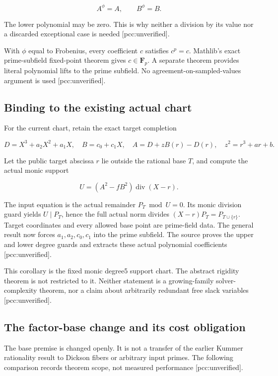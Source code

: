 \documentclass[
  10pt,
]{article}
\begin{document}
\[A^\phi=A,\qquad B^\phi=B.\]

The lower polynomial may be zero. This is why neither a division by its
value nor a discarded exceptional case is needed {[}pcc:unverified{]}.

With \(\phi\) equal to Frobenius, every coefficient \(c\) satisfies
\(c^p=c\). Mathlib's exact prime-subfield fixed-point theorem gives
\(c\in\mathbf F_p\). A separate theorem provides literal polynomial
lifts to the prime subfield. No agreement-on-sampled-values argument is
used {[}pcc:unverified{]}.

\subsection{Binding to the existing actual
chart}\label{binding-to-the-existing-actual-chart}

For the current chart, retain the exact target completion

\[
D=X^3+a_2X^2+a_1X,\quad B=c_0+c_1X,\quad
A=D+zB(r)-D(r),\quad z^2=r^3+ar+b.
\]

Let the public target abscissa \(r\) lie outside the rational base
\(T\), and compute the actual monic support

\[U=(A^2-fB^2)\operatorname{div}(X-r).\]

The input equation is the actual remainder \(P_T\bmod U=0\). Its monic
division guard yields \(U\mid P_T\), hence the full actual norm divides
\((X-r)P_T=P_{T\cup\{r\}}\). Target coordinates and every allowed base
point are prime-field data. The general result now forces
\(a_1,a_2,c_0,c_1\) into the prime subfield. The source proves the upper
and lower degree guards and extracts these actual polynomial
coefficients {[}pcc:unverified{]}.

This corollary is the fixed monic degree5 support chart. The abstract
rigidity theorem is not restricted to it. Neither statement is a
growing-family solver-complexity theorem, nor a claim about arbitrarily
redundant free slack variables {[}pcc:unverified{]}.

\subsection{The factor-base change and its cost
obligation}\label{the-factor-base-change-and-its-cost-obligation}

The base premise is changed openly. It is not a transfer of the earlier
Kummer rationality result to Dickson fibers or arbitrary input primes.
The following comparison records theorem scope, not measured performance
{[}pcc:unverified{]}.
\end{document}
